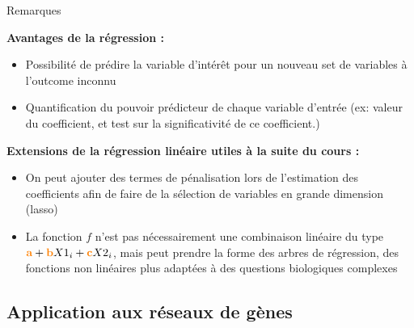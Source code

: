 	\begin{frame}{Remarques}

    	\textbf{Avantages de la régression : }
    	
    	
    	\begin{itemize} \scriptsize
    	\item Possibilité de prédire la variable d'intérêt pour un nouveau set de variables à l'outcome inconnu
    	    \item Quantification du pouvoir prédicteur de chaque variable d'entrée (ex: valeur du coefficient, et test sur la significativité de ce coefficient.)
    	\end{itemize}
    	
    	
    	
    	\vspace{0.5cm}
    	
    	\textbf{Extensions de la régression linéaire utiles à la suite du cours : }
    	
    	
    	
    	\begin{itemize} \scriptsize
    	
    	\item On peut ajouter des termes de pénalisation lors de l'estimation des coefficients afin de faire de la sélection de variables en grande dimension (lasso)
    	
    	\item La fonction $f$ n'est pas nécessairement une combinaison linéaire du type $\textcolor{orange}{\textbf{a}} + \textcolor{orange}{\textbf{b}}X1_i + \textcolor{orange}{\textbf{c}}X2_i$, mais peut prendre la forme des arbres de régression, des fonctions non linéaires plus adaptées à des questions biologiques complexes

    	\end{itemize}
    	
    	
	\end{frame}
	
	
	
\subsection{Application aux réseaux de gènes}

